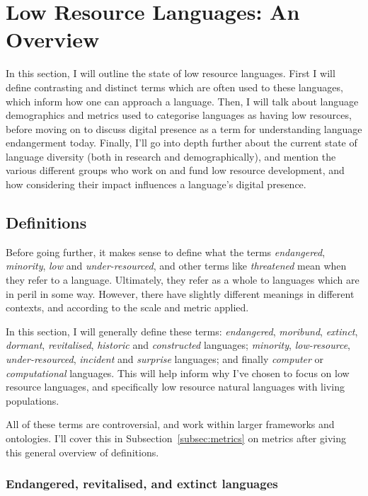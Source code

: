 \section{Low Resource Languages: An Overview}\label{sec:endlang}

In this section, I will outline the state of low resource languages. First I will define contrasting and distinct terms which are often used to these languages, which inform how one can approach a language. Then, I will talk about language demographics and metrics used to categorise languages as having low resources, before moving on to discuss digital presence as a term for understanding language endangerment today. Finally, I'll go into depth further about the current state of language diversity (both in research and demographically), and mention the various different groups who work on and fund low resource development, and how considering their impact influences a language's digital presence.

\subsection{Definitions}

Before going further, it makes sense to define what the terms \emph{endangered}, \emph{minority}, \emph{low} and \emph{under-resourced}, and other terms like \emph{threatened} mean when they refer to a language. Ultimately, they refer as a whole to languages which are in peril in some way. However, there have slightly different meanings in different contexts, and according to the scale and metric applied.

In this section, I will generally define these terms: \textit{endangered}, \textit{moribund}, \textit{extinct}, \textit{dormant}, \textit{revitalised}, \textit{historic} and \textit{constructed} languages; \textit{minority}, \textit{low-resource}, \textit{under-resourced}, \textit{incident} and \textit{surprise} languages; and finally \textit{computer} or \textit{computational} languages. This will help inform why I've chosen to focus on low resource languages, and specifically low resource natural languages with living populations.

All of these terms are controversial, and work within larger frameworks and ontologies. I'll cover this in Subsection~\ref{subsec:metrics} on metrics after giving this general overview of definitions.

\subsubsection{Endangered, revitalised, and extinct languages}

